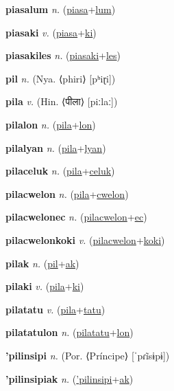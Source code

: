 \textbf{\hypertarget{piasalum}{piasalum}} \textit{n.} (\hyperlink{piasa}{piasa}+\allowbreak \hyperlink{lum}{lum})


\textbf{\hypertarget{piasaki}{piasaki}} \textit{v.} (\hyperlink{piasa}{piasa}+\allowbreak \hyperlink{ki}{ki})


\textbf{\hypertarget{piasakiles}{piasakiles}} \textit{n.} (\hyperlink{piasaki}{piasaki}+\allowbreak \hyperlink{les}{les})


\textbf{\hypertarget{pil}{pil}} \textit{n.} (Nya. ⟨phiri⟩ [pʰiɽi])


\textbf{\hypertarget{pila}{pila}} \textit{v.} (Hin. ⟨{\devanagari{}पीला}⟩ [piːlaː])


\textbf{\hypertarget{pilalon}{pilalon}} \textit{n.} (\hyperlink{pila}{pila}+\allowbreak \hyperlink{lon}{lon})


\textbf{\hypertarget{pilalyan}{pilalyan}} \textit{n.} (\hyperlink{pila}{pila}+\allowbreak \hyperlink{lyan}{lyan})


\textbf{\hypertarget{pilaceluk}{pilaceluk}} \textit{n.} (\hyperlink{pila}{pila}+\allowbreak \hyperlink{celuk}{celuk})


\textbf{\hypertarget{pilacwelon}{pilacwelon}} \textit{n.} (\hyperlink{pila}{pila}+\allowbreak \hyperlink{cwelon}{cwelon})


\textbf{\hypertarget{pilacwelonec}{pilacwelonec}} \textit{n.} (\hyperlink{pilacwelon}{pilacwelon}+\allowbreak \hyperlink{ec}{ec})


\textbf{\hypertarget{pilacwelonkoki}{pilacwelonkoki}} \textit{v.} (\hyperlink{pilacwelon}{pilacwelon}+\allowbreak \hyperlink{koki}{koki})


\textbf{\hypertarget{pilak}{pilak}} \textit{n.} (\hyperlink{pil}{pil}+\allowbreak \hyperlink{ak}{ak})


\textbf{\hypertarget{pilaki}{pilaki}} \textit{v.} (\hyperlink{pila}{pila}+\allowbreak \hyperlink{ki}{ki})


\textbf{\hypertarget{pilatatu}{pilatatu}} \textit{v.} (\hyperlink{pila}{pila}+\allowbreak \hyperlink{tatu}{tatu})


\textbf{\hypertarget{pilatatulon}{pilatatulon}} \textit{n.} (\hyperlink{pilatatu}{pilatatu}+\allowbreak \hyperlink{lon}{lon})


\textbf{\hypertarget{'pilinsipi}{'pilinsipi}} \textit{n.} (Por. ⟨Príncipe⟩ [ˈpɾĩsɨpɨ])


\textbf{\hypertarget{'pilinsipiak}{'pilinsipiak}} \textit{n.} (\hyperlink{'pilinsipi}{'pilinsipi}+\allowbreak \hyperlink{ak}{ak})


